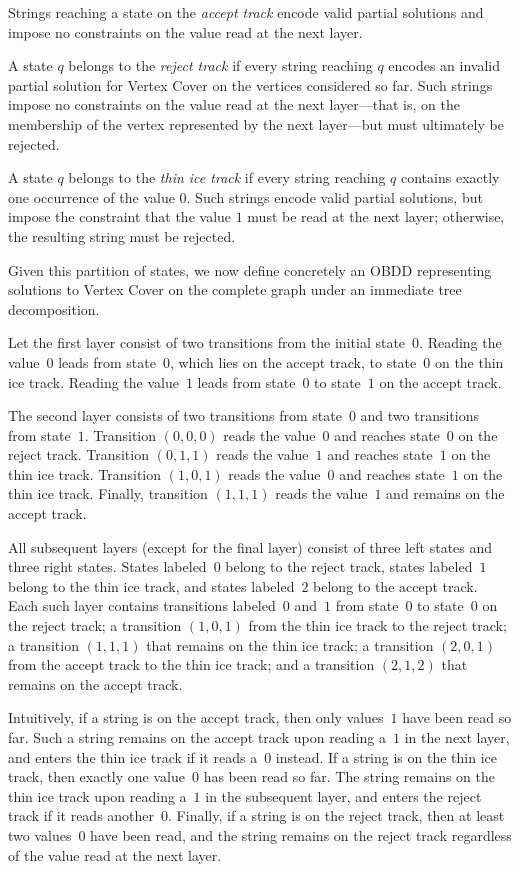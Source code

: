 Strings reaching a state on the \emph{accept track} encode valid partial
solutions and impose no constraints on the value read at the next layer.

A state $q$ belongs to the \emph{reject track} if every string reaching $q$
encodes an invalid partial solution for {\sc Vertex Cover} on the vertices
considered so far. Such strings impose no constraints on the value read at the
next layer—that is, on the membership of the vertex represented by the next
layer—but must ultimately be rejected.

A state $q$ belongs to the \emph{thin ice track} if every string reaching $q$
contains exactly one occurrence of the value $0$. Such strings encode valid
partial solutions, but impose the constraint that the value $1$ must be read at
the next layer; otherwise, the resulting string must be rejected.

Given this partition of states, we now define concretely an OBDD representing
solutions to {\sc Vertex Cover} on the complete graph under an immediate tree
decomposition.

Let the first layer consist of two transitions from the initial state~$0$.
Reading the value~$0$ leads from state~$0$, which lies on the accept track, to
state~$0$ on the thin ice track. Reading the value~$1$ leads from state~$0$ to
state~$1$ on the accept track.

The second layer consists of two transitions from state~$0$ and two transitions
from state~$1$. Transition $(0,0,0)$ reads the value~$0$ and reaches state~$0$ on
the reject track. Transition $(0,1,1)$ reads the value~$1$ and reaches state~$1$
on the thin ice track. Transition $(1,0,1)$ reads the value~$0$ and reaches
state~$1$ on the thin ice track. Finally, transition $(1,1,1)$ reads the
value~$1$ and remains on the accept track.

All subsequent layers (except for the final layer) consist of three left states
and three right states. States labeled~$0$ belong to the reject track, states
labeled~$1$ belong to the thin ice track, and states labeled~$2$ belong to the
accept track. Each such layer contains transitions labeled~$0$ and~$1$ from
state~$0$ to state~$0$ on the reject track; a transition $(1,0,1)$ from the thin
ice track to the reject track; a transition $(1,1,1)$ that remains on the thin
ice track; a transition $(2,0,1)$ from the accept track to the thin ice track;
and a transition $(2,1,2)$ that remains on the accept track.

Intuitively, if a string is on the accept track, then only values~$1$ have been
read so far. Such a string remains on the accept track upon reading a~$1$ in the
next layer, and enters the thin ice track if it reads a~$0$ instead. If a string
is on the thin ice track, then exactly one value~$0$ has been read so far. The
string remains on the thin ice track upon reading a~$1$ in the subsequent layer,
and enters the reject track if it reads another~$0$. Finally, if a string is on
the reject track, then at least two values~$0$ have been read, and the string
remains on the reject track regardless of the value read at the next layer.

